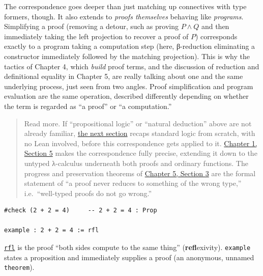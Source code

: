 The correspondence goes deeper than just matching up connectives with type formers, though. It also extends to \emph{proofs themselves} behaving like \emph{programs}. Simplifying a proof (removing a detour, such as proving \(P \wedge Q\) and then immediately taking the left projection to recover a proof of \(P\)) corresponds exactly to a program taking a computation step (here, β-reduction eliminating a constructor immediately followed by the matching projection). This is why the tactics of Chapter 4, which \emph{build} proof terms, and the discussion of reduction and definitional equality in Chapter 5, are really talking about one and the same underlying process, just seen from two angles. Proof simplification and program evaluation are the same operation, described differently depending on whether the term is regarded as ``a proof'' or ``a computation.''

\begin{quote}
Read more. If ``propositional logic'' or ``natural deduction'' above are not already familiar, \hyperref[sec:03-propositions-and-proofs:02-logic-recap:1]{the next section} recaps standard logic from scratch, with no Lean involved, before this correspondence gets applied to it. \hyperref[sec:01-basics:05-pi-sigma-and-coc:1]{Chapter 1, Section 5} makes the correspondence fully precise, extending it down to the untyped λ-calculus underneath both proofs and ordinary functions. The progress and preservation theorems of \hyperref[sec:05-rigor-check:03-typing-rules-and-safety:1]{Chapter 5, Section 3} are the formal statement of ``a proof never reduces to something of the wrong type,'' i.e.~``well-typed proofs do not go wrong.''
\end{quote}

\begin{lstlisting}
#check (2 + 2 = 4)     -- 2 + 2 = 4 : Prop

example : 2 + 2 = 4 := rfl
\end{lstlisting}

\href{https://lean-lang.org/doc/reference/latest/Tactic-Proofs/Tactic-Reference/}{\texttt{rfl}} is the proof ``both sides compute to the same thing'' (\textbf{refl}exivity). \texttt{example} states a proposition and immediately supplies a proof (an anonymous, unnamed \texttt{theorem}).

